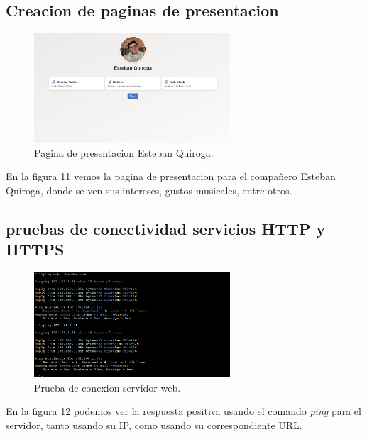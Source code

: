 \documentclass[10pt]{article}
\begin{document}
\subsection{Creacion de paginas de presentacion}
\begin{figure}[H]
    \centering
    \includegraphics[width=0.65\textwidth]{lab-01-screenshots/44-1-presentacion.png}
    \caption{Pagina de presentacion Esteban Quiroga.}
\end{figure}
En la figura 11 vemos la pagina de presentacion para el compañero Esteban Quiroga, donde se ven sus intereses, gustos musicales, entre otros.
\subsection{pruebas de conectividad servicios HTTP y HTTPS}
\begin{figure}[H]
    \centering
    \includegraphics[width=0.65\textwidth]{lab-01-screenshots/44-2-prueba.png}
    \caption{Prueba de conexion servidor web.}
\end{figure}
En la figura 12 podemos ver la respuesta positiva usando el comando \textit{ping} para el servidor, tanto usando su IP, como usando su correspondiente URL.
\end{document}
